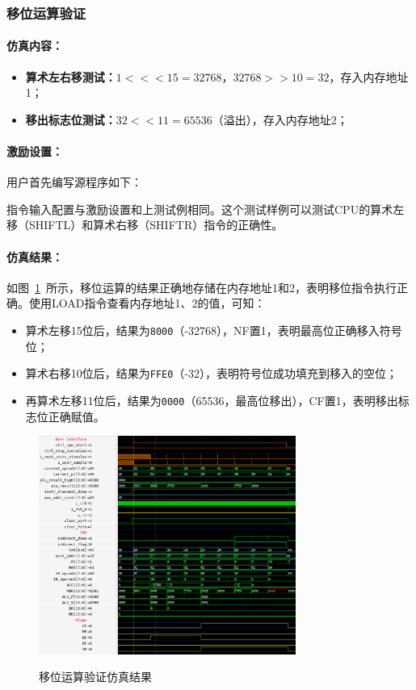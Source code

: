 \documentclass[lang=cn,a4paper,newtx]{elegantpaper}
\begin{document}
\subsubsection{移位运算验证}
\paragraph{仿真内容：}
\begin{itemize}
  \item \textbf{算术左右移测试：}$1 <<< 15 = 32768$，$32768 >> 10 = 32$，存入内存地址1；
  \item \textbf{移出标志位测试：}$32 << 11 = 65536$（溢出），存入内存地址2；
\end{itemize}



\paragraph{激励设置：}

用户首先编写源程序如下：


指令输入配置与激励设置和上测试例相同。这个测试样例可以测试CPU的算术左移（SHIFTL）和算术右移（SHIFTR）指令的正确性。

\paragraph{仿真结果：}

如图~\ref{fig:sim:3}~所示，移位运算的结果正确地存储在内存地址1和2，表明移位指令执行正确。使用LOAD指令查看内存地址1、2的值，可知：
\begin{itemize}
  \item 算术左移15位后，结果为\texttt{8000}（-32768），NF置1，表明最高位正确移入符号位；
  \item 算术右移10位后，结果为\texttt{FFE0}（-32），表明符号位成功填充到移入的空位；
  \item 再算术左移11位后，结果为\texttt{0000}（65536，最高位移出），CF置1，表明移出标志位正确赋值。
\end{itemize}

\begin{figure}[htbp]
  \centering
  \caption{移位运算验证仿真结果}
  \includegraphics[width = 0.75\textwidth]{figure/cpu_sim_shift.png}
  \label{fig:sim:3}
\end{figure}
\end{document}
